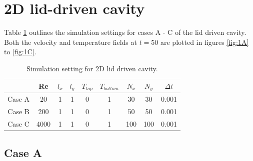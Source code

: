 \documentclass[10pt,a4paper]{article}
\begin{document}
\section{2D lid-driven cavity}

Table \ref{tbl:part1} outlines the simulation settings for cases A - C of the lid driven cavity. Both the velocity and temperature fields at $t = 50$ are plotted in figures \ref{fig:1A} to \ref{fig:1C}. 

\begin{table}[H]
\centering
\begin{tabular}{c|cccccccc}
 & Re & $l_x$ & $l_y$& $T_{top}$ & $T_{bottom}$ & $N_x$ & $N_y$ & $\Delta t$ \\ 
\hline 
Case A & 20& 1 & 1  &0 & 1  & 30 & 30 & 0.001 \\ 

Case B & 200 & 1 & 1 & 0 & 1  & 50 & 50 & 0.001 \\ 
 
Case C & 4000 & 1 & 1 & 0 & 1  & 100 & 100 & 0.001 \\ 

\end{tabular} 
\caption{Simulation setting for 2D lid driven cavity.}
\label{tbl:part1}
\end{table}

\subsection{Case A}
\end{document}
